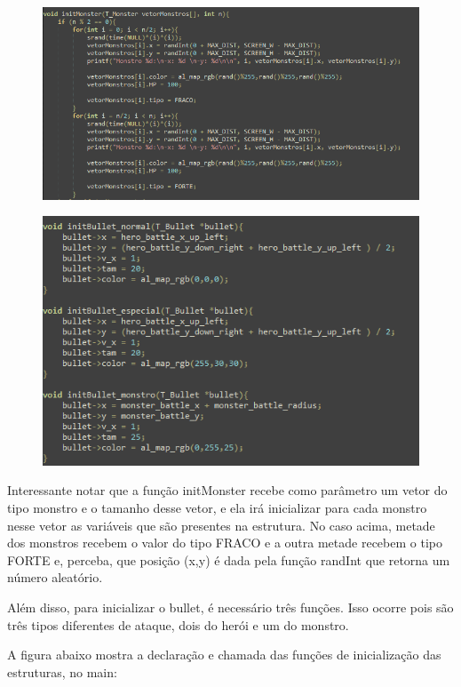 \documentclass[a4paper, 12pt]{article}
\begin{document}
\begin{figure}[H]
\centering
\includegraphics[scale=0.6]{init_monster.png}
\label{label2}
\end{figure}

\begin{figure}[H]
\centering
\includegraphics[scale=0.6]{init_bullet.png}
\label{label3}
\end{figure}

  Interessante notar que a função initMonster recebe como parâmetro um vetor do tipo monstro e o tamanho desse vetor, e ela irá inicializar para cada monstro nesse vetor as variáveis que são presentes na estrutura. No caso acima, metade dos monstros recebem o valor do tipo FRACO e a outra metade recebem o tipo FORTE e, perceba, que posição (x,y) é dada pela função randInt que retorna um número aleatório.
  
  Além disso, para inicializar o bullet, é necessário três funções. Isso ocorre pois são três tipos diferentes de ataque, dois do herói e um do monstro.
  
  A figura abaixo mostra a declaração e chamada das funções de inicialização das estruturas, no main:
\end{document}
